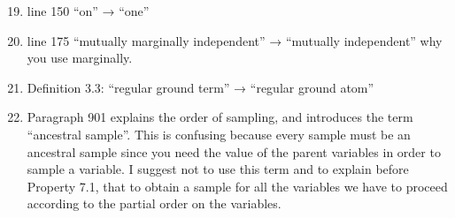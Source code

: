 \begin{enumerate}
    \setcounter{enumi}{18}
\item line 150 “on” → “one”
\\
\item line 175 “mutually marginally independent” → “mutually independent”
why you use marginally.
\\


\item Definition 3.3: “regular ground term” → “regular ground atom”
\\




\item Paragraph 901 explains the order of sampling, and introduces the term
“ancestral sample”. This is confusing because every sample must be an
ancestral sample since you need the value of the parent variables in order
to sample a variable. I suggest not to use this term and to explain before
Property 7.1, that to obtain a sample for all the variables we have to
proceed according to the partial order on the variables.




\end{enumerate}
